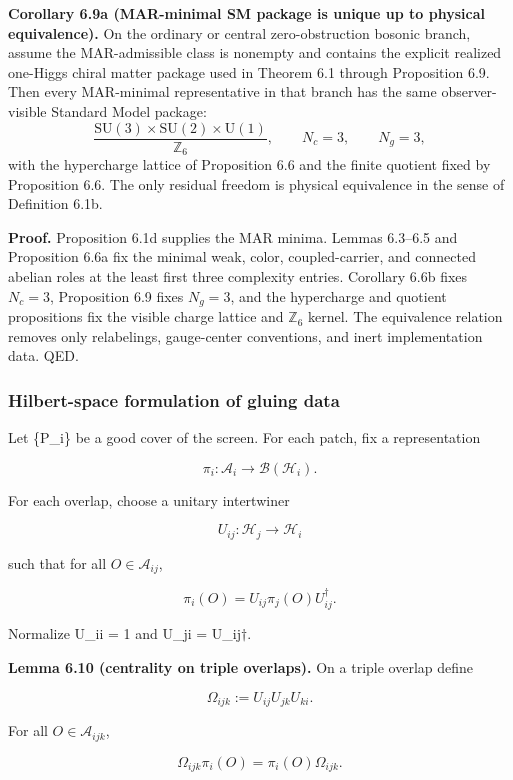 \textbf{Corollary 6.9a (MAR-minimal SM package is unique up to physical equivalence).} On the ordinary or central zero-obstruction bosonic branch, assume the MAR-admissible class is nonempty and contains the explicit realized one-Higgs chiral matter package used in Theorem 6.1 through Proposition 6.9. Then every MAR-minimal representative in that branch has the same observer-visible Standard Model package:
\[
\frac{\mathrm{SU}(3)\times\mathrm{SU}(2)\times\mathrm U(1)}{\mathbb Z_6},
\qquad
N_c=3,\qquad
N_g=3,
\]
with the hypercharge lattice of Proposition 6.6 and the finite quotient fixed by Proposition 6.6. The only residual freedom is physical equivalence in the sense of Definition 6.1b.

\textbf{Proof.} Proposition 6.1d supplies the MAR minima. Lemmas 6.3--6.5 and Proposition 6.6a fix the minimal weak, color, coupled-carrier, and connected abelian roles at the least first three complexity entries. Corollary 6.6b fixes \(N_c=3\), Proposition 6.9 fixes \(N_g=3\), and the hypercharge and quotient propositions fix the visible charge lattice and \(\mathbb Z_6\) kernel. The equivalence relation removes only relabelings, gauge-center conventions, and inert implementation data. QED.

\subsubsection{Hilbert-space formulation of gluing data}\label{65-hilbert-space-formulation-of-gluing-data}

Let \{P\_i\} be a good cover of the screen. For each patch, fix a representation

\[
\pi_i: \mathcal{A}_i \to \mathcal B(\mathcal H_i).
\]

For each overlap, choose a unitary intertwiner

\[
U_{ij}: \mathcal H_j \to \mathcal H_i
\]

such that for all \(O \in \mathcal{A}_{ij}\),

\[
\pi_i(O) = U_{ij} \pi_j(O) U_{ij}^\dagger.
\]

Normalize U\_ii = 1 and U\_ji = U\_ij\ensuremath{\dagger}.

\textbf{Lemma 6.10 (centrality on triple overlaps).} On a triple overlap define

\[
\Omega_{ijk} := U_{ij} U_{jk} U_{ki}.
\]

For all \(O \in \mathcal{A}_{ijk}\),

\[
\Omega_{ijk} \pi_i(O) = \pi_i(O) \Omega_{ijk}.
\]

